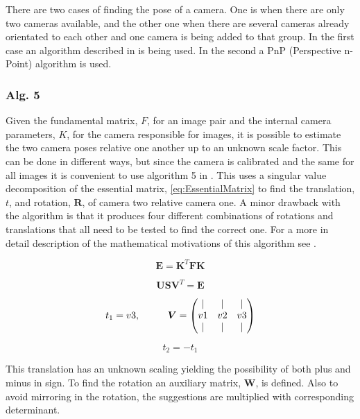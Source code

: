 There are two cases of finding the pose of a camera. One is when there are only two cameras available, and the other one when there are several cameras already orientated to each other and one camera is being added to that group. In the first case an algorithm described in \cite{Klas} is being used. In the second a PnP (Perspective n-Point) algorithm is used.

\subsubsection{Alg. 5}
Given the fundamental matrix, $F$, for an image pair and the internal camera parameters, $K$, for the camera responsible for images, it is possible to estimate the two camera poses relative one another up to an unknown scale factor. This can be done in different ways, but since the camera is calibrated and the same for all images it is convenient to use algorithm 5 in \cite{Klas}. This uses a singular value decomposition of the essential matrix, \eqref{eq:EssentialMatrix} to find the translation, $t$, and rotation, $\boldsymbol{R}$, of camera two relative camera one. A minor drawback with the algorithm is that it produces four different combinations of rotations and translations that all need to be tested to find the correct one. For a more in detail description of the mathematical motivations of this algorithm see \cite{Klas}. 

\begin{equation}
\label{eq:EssentialMatrix}
\boldsymbol{E} = \boldsymbol{K}^T \boldsymbol{FK}
\end{equation}

\begin{equation}
\boldsymbol{U S V}^T = \boldsymbol{E}
\end{equation}

\begin{equation}
t_1 = v3, \hspace{1 cm}  \boldsymbol{V} = \begin{pmatrix}
										 |  & |  & |  \\
										 v1 & v2 & v3 \\
										 |  & |  & |
										\end{pmatrix}
\end{equation}

\begin{equation}
t_2 = -t_1
\end{equation}

This translation has an unknown scaling yielding the possibility of both plus and minus in sign. To find the rotation an auxiliary matrix, $\boldsymbol{W}$, is defined. Also to avoid mirroring in the rotation, the suggestions are multiplied with corresponding determinant.

